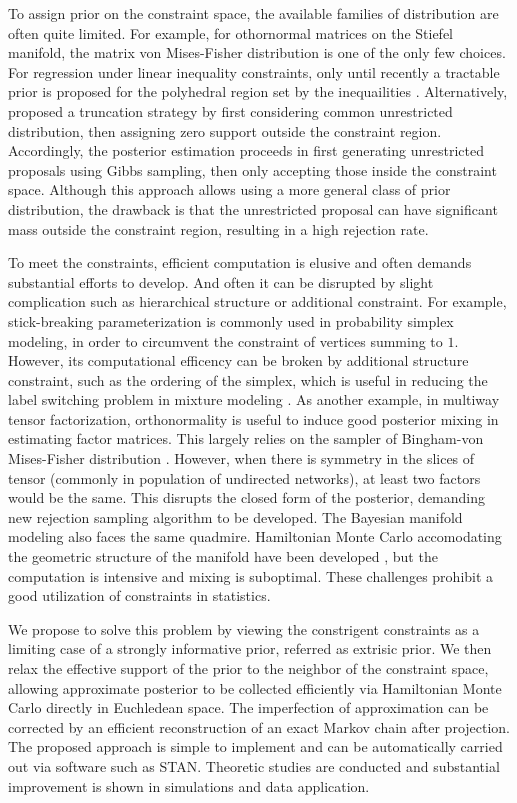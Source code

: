 \documentclass[10pt]{article}
\begin{document}
To assign prior on the constraint space, the available families of distribution are often quite limited. For example, for othornormal matrices on the Stiefel manifold, the matrix von Mises-Fisher distribution \citep{khatri1977mises} is one of the only few choices. For regression under linear inequality constraints, only until recently a tractable prior is proposed for the polyhedral region set by the inequailities \citep{danaher2012minkowski}. Alternatively, \cite{gelfand1992bayesian} proposed a truncation strategy by first considering common unrestricted distribution, then assigning zero support outside the constraint region. Accordingly, the posterior estimation proceeds in first generating unrestricted proposals using Gibbs sampling, then only accepting those inside the constraint space. Although this approach allows using a more general class of prior distribution, the drawback is that the unrestricted proposal can have significant mass outside the constraint region, resulting in a high rejection rate.

To meet the constraints, efficient computation is elusive and often demands substantial efforts to develop. And often it can be disrupted by slight complication such as hierarchical structure or additional constraint. For example, stick-breaking parameterization is commonly used in probability simplex modeling, in order to circumvent the constraint of vertices summing to $1$. However, its computational efficency can be broken by additional structure constraint, such as the ordering of the simplex, which is useful in reducing the label switching problem in mixture modeling \citep{diebolt1994estimation}. As another example, in multiway tensor factorization, orthonormality is useful to induce good posterior mixing in estimating factor matrices. This largely relies on the sampler of Bingham-von Mises-Fisher distribution \citep{hoff2016equivariant}. However, when there is symmetry in the slices of tensor (commonly in population of undirected networks), at least two factors would be the same. This disrupts the closed form of the posterior, demanding new rejection sampling algorithm to be developed. The Bayesian manifold modeling also faces the same quadmire. Hamiltonian Monte Carlo accomodating the geometric structure of the manifold have been developed \citep{girolami2011riemann,byrne2013geodesic}, but the computation is intensive and mixing is suboptimal. These challenges prohibit a good utilization of constraints in statistics.

We propose to solve this problem by viewing the constrigent constraints as a limiting case of a strongly informative prior, referred as extrisic prior. We then relax the effective support of the prior to the neighbor of the constraint space, allowing approximate posterior to be collected efficiently via Hamiltonian Monte Carlo directly in Euchledean space. The imperfection of approximation can be corrected by an efficient reconstruction of an exact Markov chain after projection. The proposed approach is simple to implement and can be automatically carried out via software such as STAN. Theoretic studies are conducted and substantial improvement is shown in simulations and data application.
\end{document}
